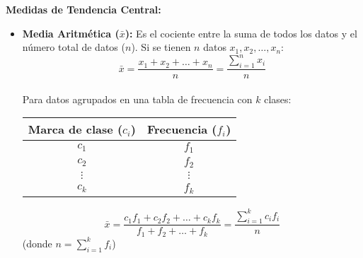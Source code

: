 \documentclass[12pt, letterpaper]{article}
\begin{document}
\textbf{Medidas de Tendencia Central:}
\begin{itemize}
    \item \textbf{Media Aritmética ($\bar{x}$):} Es el cociente entre la suma de todos los datos y el número total de datos ($n$). Si se tienen $n$ datos $x_1, x_2, \dots, x_n$:
        \[ \bar{x}=\frac{x_1+x_2+\dots+x_n}{n} = \frac{\sum_{i=1}^{n} x_i}{n} \] \\
    Para datos agrupados en una tabla de frecuencia con $k$ clases:
    \begin{center}
        \begin{minipage}{0.45\textwidth}
            \centering
            \begin{tabularx}{\linewidth}{|c|c|} %
                \hline
                \textbf{Marca de clase ($c_i$)} & \textbf{Frecuencia ($f_i$)} \\
                \hline
                $c_1$ & $f_1$ \\
                \hline
                $c_2$ & $f_2$ \\
                \hline
                $\vdots$ & $\vdots$ \\
                \hline
                $c_k$ & $f_k$ \\
                \hline
             \end{tabularx}
        \end{minipage}
        \hfill
        \begin{minipage}{0.45\textwidth}
            \centering
            \[
            \bar{x}=\frac{c_1 f_1 + c_2 f_2 + \dots + c_k f_k}{f_1+f_2+\dots+f_k} = \frac{\sum_{i=1}^{k} c_i f_i}{n}
            \]
            (donde $n = \sum_{i=1}^{k} f_i$)
        \end{minipage}
    \end{center}



\end{itemize}
\end{document}
